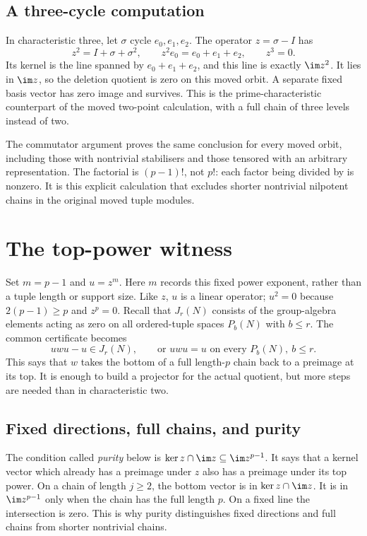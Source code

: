 \subsection{A three-cycle computation}
In characteristic three, let $\sigma$ cycle $e_0,e_1,e_2$.
The operator $z=\sigma-I$ has
\[
 z^2=I+\sigma+\sigma^2,\qquad
 z^2 e_0=e_0+e_1+e_2,\qquad z^3=0.
\]
Its kernel is the line spanned by $e_0+e_1+e_2$, and this line is
exactly $\im z^2$. It lies in $\im z$, so the deletion quotient
is zero on this moved orbit. A separate fixed basis vector has
zero image and survives. This is the prime-characteristic counterpart
of the moved two-point calculation, with a full chain of three
levels instead of two.

The commutator argument proves the same conclusion for every moved
orbit, including those with nontrivial stabilisers and those tensored
with an arbitrary representation. The factorial is $(p-1)!$, not
$p!$: each factor being divided by is nonzero. It is this explicit
calculation that excludes shorter nontrivial nilpotent chains in
the original moved tuple modules.

\section{The top-power witness}\label{tx:sec:topwitness}
Set $m=p-1$ and $u=z^m$. Here $m$ records this fixed power
exponent, rather than a tuple length or support size. Like $z$, $u$ is a linear operator; $u^2=0$ because
$2(p-1)\ge p$ and $z^p=0$. Recall that $J_r(N)$ consists of the
group-algebra elements acting as zero on all ordered-tuple spaces
$P_b(N)$ with $b\le r$. The common certificate becomes
\begin{equation}\label{tx:eq:topwitness}uwu-u\in J_r(N),\qquad\text{or }uwu=u\text{ on every }P_b(N),\ b\le r.
\end{equation}
This says that $w$ takes the bottom of a full length-$p$ chain back to a preimage at its top. It is enough to build a projector for the actual quotient, but more steps are needed than in characteristic two.

\subsection{Fixed directions, full chains, and purity}
The condition called \emph{purity} below is
$\ker z\cap\im z\subseteq\im z^{p-1}$. It says that a kernel
vector which already has a preimage under $z$ also has a preimage
under its top power. On a chain of length $j\ge2$, the bottom vector
is in $\ker z\cap\im z$. It is in $\im z^{p-1}$ only when the
chain has the full length $p$. On a fixed line the intersection is
zero. This is why purity distinguishes fixed directions and full
chains from shorter nontrivial chains.

